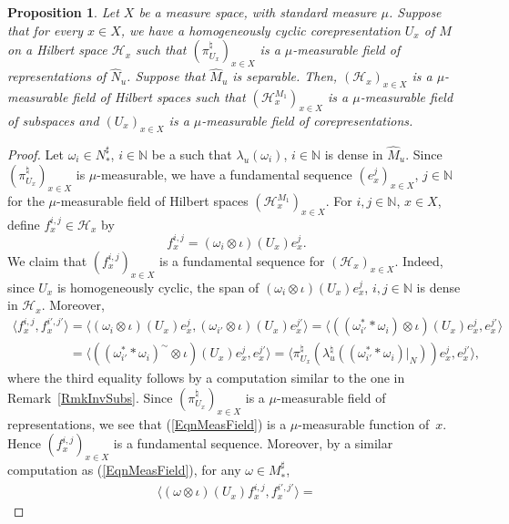 \documentclass[11pt]{article}
\numberwithin{equation}{section}
\newtheorem{prop}[thm]{Proposition}
\theoremstyle{definition}
\newcommand{\cHil}{\mathcal{H}}
\begin{document}
\begin{prop}\label{PropMeas}
Let $X$ be a measure space, with standard measure $\mu$. Suppose that for every $x \in X$, we have a homogeneously cyclic corepresentation $U_x$ of $M$ on a Hilbert space $\cHil_x$ such that $(\pi_{U_x}^\natural)_{x \in X}$ is a $\mu$-measurable field of representations of $\hat{N}_u$. Suppose that $\hat{M}_u$ is separable. Then, $(\cHil_x)_{x \in X}$ is a $\mu$-measurable field of Hilbert spaces such that $(\cHil_x^{M_1})_{x \in X}$ is a $\mu$-measurable field of subspaces and $(U_x)_{x \in X}$ is a $\mu$-measurable field of corepresentations.
\end{prop}
\begin{proof}
Let $\omega_i \in N_\ast^\sharp$, $i \in \mathbb{N}$ be a such that $\lambda_u(\omega_i)$, $i \in \mathbb{N}$ is dense in $\hat{M}_u$. Since $(\pi_{U_x}^\natural)_{x \in X}$ is $\mu$-measurable, we have a fundamental sequence $(e_x^j)_{x\in X}$, $j \in \mathbb{N}$ for the $\mu$-measurable f\/ield of Hilbert spaces $(\cHil_x^{M_1})_{x \in X}$. For $i, j \in \mathbb{N}$, $x \in X$, def\/ine $f^{i,j}_x \in \cHil_x$ by
\[
f^{i,j}_x = (\omega_i \otimes \iota)(U_x) e^j_x.
\]
We claim that $(f^{i,j}_x)_{x\in X}$ is a fundamental sequence for $(\cHil_x)_{x \in X}$. Indeed, since $U_x$ is homogeneously cyclic, the span of $(\omega_i \otimes \iota)(U_x) e^j_x$, $i, j \in \mathbb{N}$ is dense in $\cHil_x$. Moreover,
\begin{gather}
\langle f^{i,j}_x , f^{i',j'}_x \rangle =   \langle (\omega_i \otimes \iota)(U_x) e^j_x, (\omega_{i'} \otimes \iota)(U_x) e^{j'}_x \rangle =
\langle ((\omega_{i'}^\ast \ast \omega_i) \otimes \iota)(U_x) e^j_x, e^{j'}_x \rangle
\nonumber \\
\phantom{\langle f^{i,j}_x , f^{i',j'}_x \rangle}{}
=
\langle ((\omega_{i'}^\ast \ast \omega_i)^\sim \otimes \iota)(U_x) e^j_x, e^{j'}_x \rangle = \langle \pi_{U_x}^\natural(\lambda_u^\natural((\omega_{i'}^\ast \ast \omega_i)\vert_N))  e^j_x, e^{j'}_x \rangle,\label{EqnMeasField}
\end{gather}
where the third equality follows by a computation similar to the one in Remark~\ref{RmkInvSubs}.
Since $(\pi_{U_x}^\natural)_{x\in X}$ is a $\mu$-measurable f\/ield of representations, we see that (\ref{EqnMeasField}) is a $\mu$-measurable function of~$x$. Hence $(f^{i,j}_x)_{x\in X}$ is a fundamental sequence. Moreover, by a similar computation as (\ref{EqnMeasField}), for any $\omega \in M_\ast^\sharp$,
\begin{gather*}
\langle (\omega \otimes \iota)(U_x) f^{i,j}_x, f^{i',j'}_x \rangle =

\end{gather*}
\end{proof}
\end{document}
